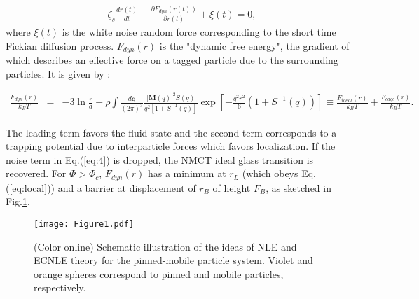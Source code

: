 \documentclass[twocolumn,showpacs,preprintnumbers,amsmath,amssymb,unsortedaddress,
]{revtex4-1}
\begin{document}
\begin{eqnarray}
\zeta_s\frac{dr(t)}{dt}-\frac{\partial F_{dyn}(r(t))}{\partial r(t)}+ \xi(t) = 0,
\label{eq:4}
\end{eqnarray}
where $\xi(t)$ is the white noise random force corresponding to the short time Fickian diffusion process. $F_{dyn}(r)$ is the "dynamic free energy", the gradient of which describes an effective force on a tagged particle due to the surrounding particles. It is given by \cite{10,33,37}:
\begin{widetext}
\begin{eqnarray}
\frac{F_{dyn}(r)}{k_BT} &=& -3\ln\frac{r}{d}-\rho\int\frac{d\mathbf{q}}{(2\pi)^3}\frac{\left|\mathbf{M}(q)\right|^2S(q)}{q^2\left[1+S^{-1}(q) \right]}\exp\left[-\frac{q^2r^2}{6}\left(1+S^{-1}(q) \right) \right] \equiv \frac{F_{ideal}(r)}{k_BT}+\frac{F_{cage}(r)}{k_BT}.
\label{eq:free}
\end{eqnarray}
\end{widetext}
The leading term favors the fluid state and the second term corresponds to a trapping potential due to interparticle forces which favors localization. If the noise term in Eq.(\ref{eq:4}) is dropped, the NMCT ideal glass transition is recovered. For $\Phi > \Phi_c$, $F_{dyn}(r)$ has a minimum at $r_L$ (which obeys Eq.(\ref{eq:local})) and a barrier at displacement of $r_B$ of height  $F_B$, as sketched in Fig.\ref{fig:1}.

\begin{figure}[htp]
\center
\texttt{[image: Figure1.pdf]}
\caption{\label{fig:1}(Color online) Schematic illustration of the ideas of NLE and ECNLE theory for the pinned-mobile particle system. Violet and orange spheres correspond to pinned and mobile particles, respectively.}
\end{figure}
\end{document}
